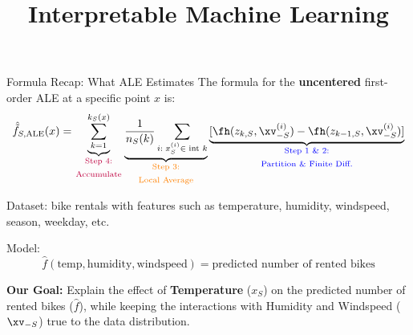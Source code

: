 \documentclass[10pt,compress,t,notes=noshow,xcolor=table]{beamer}
\title{Interpretable Machine Learning}
\begin{document}

\begin{framev}[align=top]{Formula Recap: What ALE Estimates}
The formula for the \textbf{uncentered} first-order ALE at a specific point $x$ is:
\spacer[0.5]
$$
\hat{\tilde{f}}_{S, \text{ALE}}(x) = \underbrace{ \sum_{k = 1}^{k_S(x)} }_{\text{\parbox{1.5cm}{\centering \textcolor{purple}{Step 4:\\ Accumulate}}}} \underbrace{ \frac{1}{n_S(k)} \sum_{i: \; x_S^{(i)} \in \; \text{int } k} }_{\text{\parbox{2cm}{\centering \textcolor{orange}{Step 3:\\ Local Average}}}} \underbrace{ [\fh(z_{k, S}, \xv_{-S}^{(i)}) -\fh(z_{k-1, S}, \xv_{-S}^{(i)})] }_{\text{\parbox{3cm}{\centering \textcolor{blue}{Step 1 \& 2:\\ Partition \& Finite Diff.}}}}
$$
\spacer[0.5]
\begin{itemizeM}
\item Dataset: bike rentals with features such as temperature, humidity, windspeed, season, weekday, etc.
\item Model:
$$
\hat f(\text{temp}, \text{humidity}, \text{windspeed})
=
\text{predicted number of rented bikes}
$$
\item \textbf{Our Goal:} Explain the effect of \textbf{Temperature} ($x_S$) on the predicted number of rented bikes ($\hat{f}$), while keeping the interactions with Humidity and Windspeed ($\xv_{-S}$) true to the data distribution.
\end{itemizeM}
\end{framev}
\end{document}
